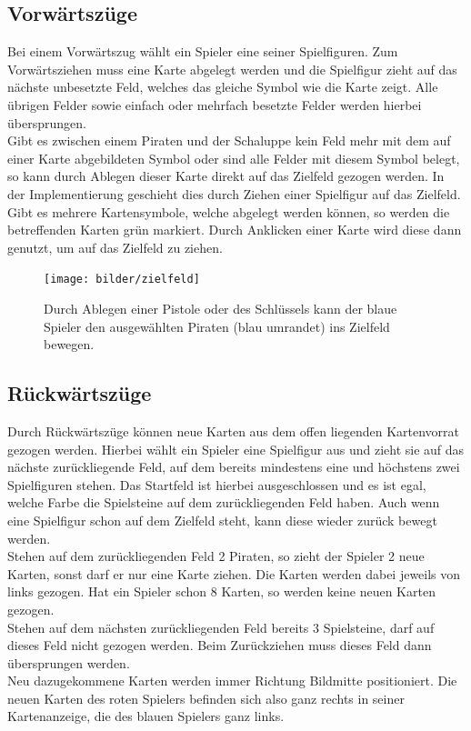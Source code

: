 \documentclass[a4paper, ngerman]{scrartcl}
\begin{document}
	
	
	\subsection{Vorwärtszüge}
	Bei einem Vorwärtszug wählt ein Spieler eine seiner
	Spiel\-figuren. Zum Vorwärtsziehen muss eine Karte
	abgelegt werden und die Spielfigur zieht auf das nächste unbesetzte Feld,
	welches das gleiche Symbol wie die Karte zeigt. Alle übrigen Felder sowie
	einfach oder mehrfach besetzte Felder werden hierbei übersprungen.\\
	Gibt es zwischen einem Piraten und der Schaluppe kein Feld mehr mit dem auf
	einer Karte abgebildeten Symbol oder sind alle Felder mit diesem Symbol
	belegt, so kann durch Ablegen dieser Karte direkt auf das Zielfeld gezogen
	werden. In der Implementierung geschieht dies durch Ziehen einer Spielfigur auf
	das Zielfeld. Gibt es mehrere Kartensymbole, welche abgelegt werden können, so
	werden die betreffenden Karten grün markiert. Durch Anklicken einer Karte wird
	diese dann genutzt, um auf das Zielfeld zu ziehen.
	
	\begin{figure}[h]
		\centering
		\texttt{[image: bilder/zielfeld]}
		\caption{Durch Ablegen einer Pistole oder des Schlüssels kann der blaue
		Spieler den ausgewählten Piraten (blau umrandet) ins Zielfeld bewegen.}
		\label{fig:Zielfeld}
	\end{figure}
	 
\subsection{Rückwärtszüge}
Durch Rückwärtszüge können neue Karten aus dem offen liegenden Kartenvorrat
gezogen werden.
Hierbei wählt ein Spieler eine Spielfigur aus und zieht sie auf das nächste
zurückliegende Feld, auf dem bereits mindestens eine und höchstens zwei
Spielfiguren stehen. Das Startfeld ist hierbei ausgeschlossen und es ist egal,
welche Farbe die Spielsteine auf dem zurückliegenden Feld haben. Auch wenn eine
Spielfigur schon auf dem Zielfeld steht, kann diese wieder zurück bewegt
werden.\\
Stehen auf dem zurückliegenden Feld 2 Piraten, so zieht der Spieler 2 neue
Karten, sonst darf er nur eine Karte ziehen. Die Karten werden dabei jeweils von
links gezogen. Hat ein Spieler schon 8 Karten, so werden keine neuen Karten
gezogen.\\
Stehen auf dem nächsten zurückliegenden Feld bereits 3 Spielsteine, darf auf
dieses Feld nicht gezogen werden. Beim Zurückziehen muss dieses Feld dann
übersprungen werden.\\
Neu dazugekommene Karten werden immer
Richtung Bildmitte positioniert. Die neuen Karten des roten Spielers befinden sich also ganz rechts in seiner
Kartenanzeige, die des blauen Spielers ganz links.
\end{document}
